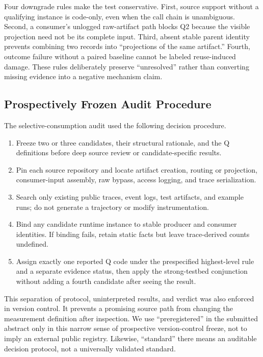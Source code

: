 \documentclass[letterpaper]{article} %
\begin{document}
Four downgrade rules make the test conservative. First, source support without
a qualifying instance is code-only, even when the call chain is unambiguous.
Second, a consumer's unlogged raw-artifact path blocks Q2 because the visible
projection need not be its complete input. Third, absent stable parent identity
prevents combining two records into ``projections of the same artifact.''
Fourth, outcome failure without a paired baseline cannot be labeled
reuse-induced damage. These rules deliberately preserve ``unresolved'' rather
than converting missing evidence into a negative mechanism claim.

\subsection{Prospectively Frozen Audit Procedure}

The selective-consumption audit used the following decision procedure.

\begin{enumerate}
    \item Freeze two or three candidates, their structural rationale, and the
    Q definitions before deep source review or candidate-specific results.
    \item Pin each source repository and locate artifact creation, routing or
    projection, consumer-input assembly, raw bypass, access logging, and trace
    serialization.
    \item Search only existing public traces, event logs, test artifacts, and
    example runs; do not generate a trajectory or modify instrumentation.
    \item Bind any candidate runtime instance to stable producer and consumer
    identities. If binding fails, retain static facts but leave trace-derived
    counts undefined.
    \item Assign exactly one reported Q code under the prespecified
    highest-level rule and a separate evidence status, then apply the
    strong-testbed conjunction without adding a fourth
    candidate after seeing the result.
\end{enumerate}

This separation of protocol, uninterpreted results, and verdict was also
enforced in version control. It prevents a promising source path from changing
the measurement definition after inspection. We use ``preregistered'' in the
submitted abstract only in this narrow sense of prospective version-control
freeze, not to imply an external public registry. Likewise, ``standard'' there
means an auditable decision protocol, not a universally validated standard.
\end{document}
